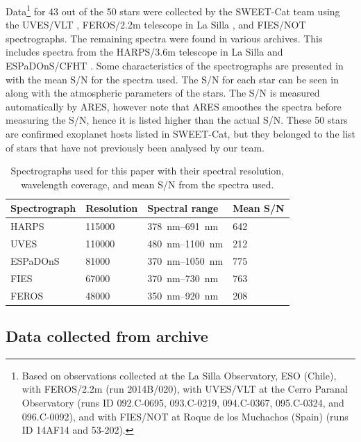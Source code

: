 Data\footnote{Based on observations collected at the La Silla Observatory, ESO (Chile), with
FEROS/2.2m (run 2014B/020), with UVES/VLT at the Cerro Paranal Observatory (runs ID 092.C-0695,
093.C-0219, 094.C-0367, 095.C-0324, and 096.C-0092), and with FIES/NOT at Roque de los Muchachos
(Spain) (runs ID 14AF14 and 53-202).} for 43 out of the 50 stars were collected by the SWEET-Cat
team using the UVES/VLT \citep{UVES}, FEROS/2.2m telescope in La Silla \citep{FEROS}, and FIES/NOT
\citep{FIES} spectrographs. The remaining spectra were found in various archives. This includes
spectra from the HARPS/3.6m telescope in La Silla \citep{HARPS} and ESPaDOnS/CFHT \citep{ESPADONS}.
Some characteristics of the spectrographs are presented in  with the mean S/N
for the spectra used. The S/N for each star can be seen in  along with the
atmospheric parameters of the stars. The S/N is measured automatically by ARES, however note that
ARES smoothes the spectra before measuring the S/N, hence it is listed higher than the actual S/N.
These 50 stars are confirmed exoplanet hosts listed in SWEET-Cat, but they belonged to the list of
stars that have not previously been analysed by our team.


\begin{table}[htb!]
    \caption{Spectrographs used for this paper with their spectral resolution,
             wavelength coverage, and mean S/N from the spectra used.}
    \label{tab:instruments}
    \centering
    \begin{tabular}{llll}
      \hline\hline
      Spectrograph & Resolution    & Spectral range            &   Mean S/N  \\
      \hline
      HARPS        &  \num{115000} & \SIrange{378}{691}{nm}    &   642       \\
      UVES         &  \num{110000} & \SIrange{480}{1100}{nm}   &   212       \\
      ESPaDOnS     &   \num{81000} & \SIrange{370}{1050}{nm}   &   775       \\
      FIES         &   \num{67000} & \SIrange{370}{730}{nm}    &   763       \\
      FEROS        &   \num{48000} & \SIrange{350}{920}{nm}    &   208       \\
      \hline
    \end{tabular}
\end{table}


\subsection{Data collected from archive}

